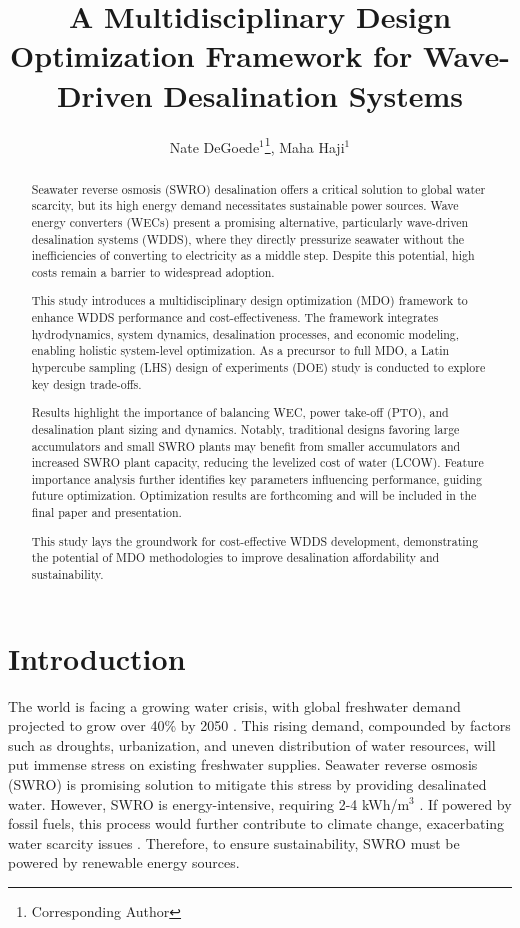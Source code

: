 \documentclass[twocolumn,10pt]{asme2e}
\title{ \vspace{-10 mm} A Multidisciplinary Design Optimization Framework for Wave-Driven Desalination Systems}
\author{Nate DeGoede$^1$\thanks{Corresponding Author}, Maha Haji$^1$
    \affiliation{
	$^1$Sibley School of Mechanical and Aerospace Engineering\\
	Cornell University\\
	Ithaca, New York 14853\\
    Email: \{njd76, maha\}@cornell.edu 
    }
}
\begin{document}
\maketitle

\setlength{\abovedisplayskip}{10pt}
\setlength{\belowdisplayskip}{10pt}

\begin{abstract}

Seawater reverse osmosis (SWRO) desalination offers a critical solution to global water scarcity, but its high energy demand necessitates sustainable power sources. Wave energy converters (WECs) present a promising alternative, particularly wave-driven desalination systems (WDDS), where they directly pressurize seawater without the inefficiencies of converting to electricity as a middle step. Despite this potential, high costs remain a barrier to widespread adoption. 

This study introduces a multidisciplinary design optimization (MDO) framework to enhance WDDS performance and cost-effectiveness. The framework integrates hydrodynamics, system dynamics, desalination processes, and economic modeling, enabling holistic system-level optimization.  As a precursor to full MDO, a Latin hypercube sampling (LHS) design of experiments (DOE) study is conducted to explore key design trade-offs. 

Results highlight the importance of balancing WEC, power take-off (PTO), and desalination plant sizing and dynamics. Notably, traditional designs favoring large accumulators and small SWRO plants may benefit from smaller accumulators and increased SWRO plant capacity, reducing the levelized cost of water (LCOW). Feature importance analysis further identifies key parameters influencing performance, guiding future optimization. Optimization results are forthcoming and will be included in the final paper and presentation.

This study lays the groundwork for cost-effective WDDS development, demonstrating the potential of MDO methodologies to improve desalination affordability and sustainability.

\end{abstract}


\section{Introduction}

The world is facing a growing water crisis, with global freshwater demand projected to grow over 40\% by 2050 \cite{watershortage2015}. This rising demand, compounded by factors such as droughts, urbanization, and uneven distribution of water resources, will put immense stress on existing freshwater supplies. Seawater reverse osmosis (SWRO) is promising solution to mitigate this stress by providing desalinated water. However, SWRO is energy-intensive, requiring 2-4 kWh/m$^3$ \cite{Li2018}. If powered by fossil fuels, this process would further contribute to climate change, exacerbating water scarcity issues \cite{nytdrought}. Therefore, to ensure sustainability, SWRO must be powered by renewable energy sources. 
\end{document}
